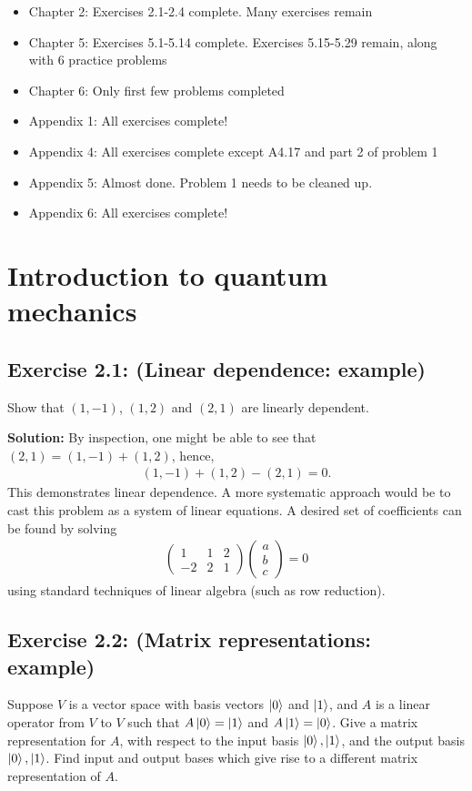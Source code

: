 \documentclass{book}
\begin{document}
\begin{itemize}
    \item Chapter 2: Exercises 2.1-2.4 complete. Many exercises remain
    \item Chapter 5: Exercises 5.1-5.14 complete. Exercises 5.15-5.29 remain, along with 6 practice problems
    \item Chapter 6: Only first few problems completed
    \item Appendix 1: All exercises complete!
    \item Appendix 4: All exercises complete except A4.17 and part 2 of problem 1
    \item Appendix 5: Almost done. Problem 1 needs to be cleaned up. 
    \item Appendix 6: All exercises complete!
\end{itemize}

\chapter{Introduction to quantum mechanics}


\section*{Exercise 2.1: (Linear dependence: example)}
    Show that $(1,-1)$, $(1, 2)$ and $(2, 1)$ are linearly dependent.
    
    \textbf{Solution:} By inspection, one might be able to see that $(2,1)=(1,-1) + (1,2)$, hence,
    \begin{align}
        (1,-1)+(1,2) -(2,1) = 0.
    \end{align}
    This demonstrates linear dependence. A more systematic approach would be to cast this problem as a system of linear equations. A desired set of coefficients can be found by solving
    \begin{align}
    \begin{pmatrix}
        1 & 1 & 2 \\
        -2 & 2 & 1
    \end{pmatrix}
    \begin{pmatrix}
        a \\
        b \\
        c
    \end{pmatrix}
    =0
    \end{align}
    using standard techniques of linear algebra (such as row reduction).

\section*{Exercise 2.2: (Matrix representations: example)}
    Suppose $V$ is a vector space with basis vectors $\ket{0}$ and $\ket{1}$, and $A$ is a linear operator from $V$ to $V$ such that $A\ket{0}=\ket{1}$ and $A\ket{1}=\ket{0}$. Give a matrix representation for $A$, with respect to the input basis $\ket{0}, \ket{1}$, and the output basis $\ket{0}, \ket{1}$. Find input and output bases which give rise to a different matrix representation of $A$.
    
\end{document}
